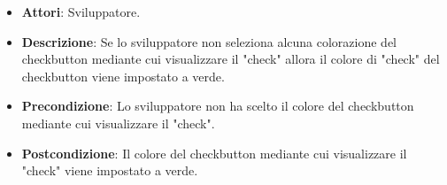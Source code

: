 
\FloatBarrier
\begin{itemize}
\item\textbf{Attori}: Sviluppatore.
\item\textbf{Descrizione}: Se lo sviluppatore non seleziona alcuna colorazione del checkbutton mediante cui visualizzare il "check" allora il colore di "check" del checkbutton viene impostato a verde.
\item\textbf{Precondizione}: Lo sviluppatore non ha scelto il colore del checkbutton mediante cui visualizzare il "check".
\item\textbf{Postcondizione}: Il colore del checkbutton mediante cui visualizzare il "check" viene impostato a verde.
\end{itemize}
